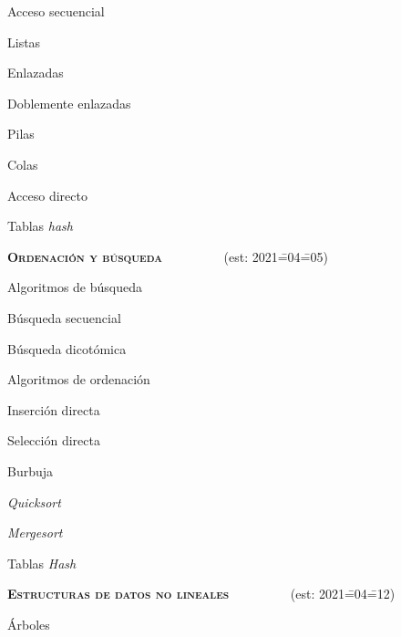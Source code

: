 \begin{longenum}
\begin{longenum}
        \item Acceso secuencial
        \begin{longenum}
            \item Listas
            \begin{longenum}
                \item Enlazadas
                \item Doblemente enlazadas
            \end{longenum}
            \item Pilas
            \item Colas
        \end{longenum}
        \item Acceso directo
        \begin{longenum}
            \item Tablas \textit{hash}
        \end{longenum}
    \end{longenum}
    \item \textbf{\textsc{Ordenación y búsqueda}} \ \ \ \ \ \ \ \ \ (est: 2021\==04\==05)
    \begin{longenum}
        \item Algoritmos de búsqueda
        \begin{longenum}
            \item Búsqueda secuencial
            \item Búsqueda dicotómica
        \end{longenum}
        \item Algoritmos de ordenación
        \begin{longenum}
            \item Inserción directa
            \item Selección directa
            \item Burbuja
            \item \textit{Quicksort}
            \item \textit{Mergesort}
        \end{longenum}
        \item Tablas \textit{Hash}
    \end{longenum}
    \item \textbf{\textsc{Estructuras de datos no lineales}} \ \ \ \ \ \ \ \ \ (est: 2021\==04\==12)
    \begin{longenum}
        \item Árboles

\end{longenum}
\end{longenum}
